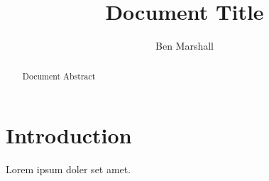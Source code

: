 \documentclass[a4paper,12pt, twoside]{article}
\title{
    Document Title
    \vspace{5mm}
}
\author{Ben Marshall}
\begin{document}
\maketitle

\begin{abstract}
Document Abstract
\end{abstract}

\tableofcontents

\section{Introduction}

Lorem ipsum doler set amet.

\newpage
\nocite{*} %


\end{document}
